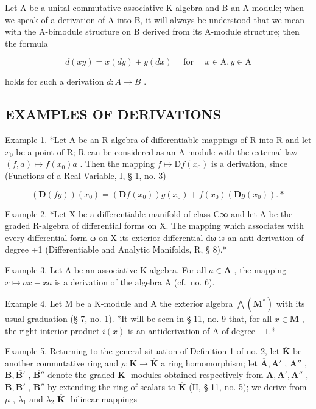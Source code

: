 Let A be a unital commutative associative K-algebra and B an A-module; when we speak of a derivation of A into B, it will always be understood that we mean with the A-bimodule structure on B derived from its A-module structure; then the formula

\[
d (x y) = x (d y) + y (d x) \quad \text { for } \quad x \in \mathrm{A}, y \in \mathrm{A}\tag{9}
\]

holds for such a derivation \(d: A \rightarrow B\) .

\subsection{EXAMPLES OF DERIVATIONS}

Example 1. *Let A be an R-algebra of differentiable mappings of R into R and let \(x_0\) be a point of R; R can be considered as an A-module with the external law \((f, a) \mapsto f(x_0)a\) . Then the mapping \(f \mapsto \mathrm{D}f(x_0)\) is a derivation, since (Functions of a Real Variable, I, § 1, no. 3)

\[
(\mathbf {D} (f g)) (x _ {0}) = (\mathbf {D} f (x _ {0})) g (x _ {0}) + f (x _ {0}) (\mathbf {D} g (x _ {0})). *
\]

Example 2. *Let X be a differentiable manifold of class C∞ and let A be the graded R-algebra of differential forms on X. The mapping which associates with every differential form ω on X its exterior differential dω is an anti-derivation of degree +1 (Differentiable and Analytic Manifolds, R, § 8).*

Example 3. Let A be an associative K-algebra. For all \(a \in \mathbf{A}\) , the mapping \(x \mapsto ax - xa\) is a derivation of the algebra A (cf.~no. 6).

Example 4. Let M be a K-module and A the exterior algebra \(\bigwedge (\mathbf{M}^{*})\) with its usual graduation (§ 7, no. 1). *It will be seen in § 11, no. 9 that, for all \(x\in \mathbf{M}\) , the right interior product \(i(x)\) is an antiderivation of A of degree \(-1\).*

Example 5. Returning to the general situation of Definition 1 of no. 2, let \(\overline{\mathbf{K}}\) be another commutative ring and \(\rho: \mathbf{K} \to \overline{\mathbf{K}}\) a ring homomorphism; let \(\overline{\mathbf{A}}, \overline{\mathbf{A}'}\) , \(\overline{\mathbf{A}''}\) , \(\overline{\mathbf{B}}, \overline{\mathbf{B}'}\) , \(\overline{\mathbf{B}''}\) denote the graded \(\overline{\mathbf{K}}\) -modules obtained respectively from \(\mathbf{A}, \mathbf{A}', \mathbf{A}''\) , \(\mathbf{B}, \mathbf{B}'\) , \(\mathbf{B}''\) by extending the ring of scalars to \(\overline{\mathbf{K}}\) (II, § 11, no. 5); we derive from \(\mu\) , \(\lambda_1\) and \(\lambda_2\) \(\overline{\mathbf{K}}\) -bilinear mappings

